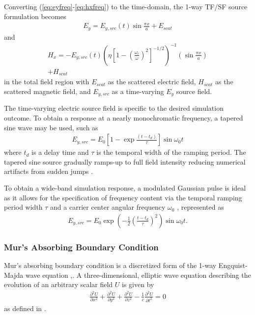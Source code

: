 Converting  (\ref{eq:eyfreq}-\ref{eq:hxfreq}) to the time-domain, the 1-way TF/SF source formulation becomes
\begin{align}
	E_y=E_{y,src}(t)\sin{\frac{\pi x}{a}} + E_{scat}
	\label{eq:tfsf-ey}
\end{align}
and
\begin{multline}
	H_x = -E_{y,src}(t)\left(\eta\left[1-\left(\frac{\omega_c}{\omega}\right)^2\right]^{-1/2}\right)^{-1}\left(\sin{\frac{\pi x}{a}}\right) \\ + H_{scat}
	\label{eq:tfsf-hx}
\end{multline}
in the total field region with $E_{scat}$ as the scattered electric field, $H_{scat}$ as the scattered magnetic field, and $E_{y,src}$ as a time-varying $E_y$ source field. 

The time-varying electric source field is specific to the desired simulation outcome. To obtain a response at a nearly monochromatic frequency, a tapered sine wave may be used, such as
\begin{align}
	E_{y,src} = E_0\left[1 - \exp{\frac{(t - t_d)}{\tau}}\right]\sin{\omega_0 t}
	\label{eq:tapered-sin}
\end{align}
where $t_d$ is a delay time and $\tau$ is the temporal width of the ramping period. The tapered sine source gradually ramps-up to full field intensity reducing numerical artifacts from sudden jumps \cite{rothlecnotes}.

To obtain a wide-band simulation response, a modulated Gaussian pulse is ideal as it allows for the specification of frequency content via the temporal ramping period width $\tau$ and a carrier center angular frequency $\omega_0$ \cite{rothlecnotes}, represented as 
\begin{align}
	E_{y,src} = E_0\exp{\left(-\frac{1}{2}\left(\frac{t-t_d}{\tau}\right)^2\right)}\sin{\omega_0t}.
	\label{eq:mod-gauss}
\end{align}

\subsubsection{Mur's Absorbing Boundary Condition}
\label{subsubsec:murtheory}
Mur's absorbing boundary condition is a discretized form of the 1-way Engquist-Majda wave equation \cite{rothlecnotes},\cite{taftlovefdtd}. A three-dimensional, elliptic wave equation describing the evolution of an arbitrary scalar field $U$ is given by
\begin{align}
	\frac{\partial^2 U}{\partial x^2}+\frac{\partial^2 U}{\partial y^2}+\frac{\partial^2 U}{\partial z^2}-\frac{1}{c}\frac{\partial^2 U}{\partial t^2}=0
	\label{eq:scalarelliptic}
\end{align}
as defined in \cite{taftlovefdtd}.

